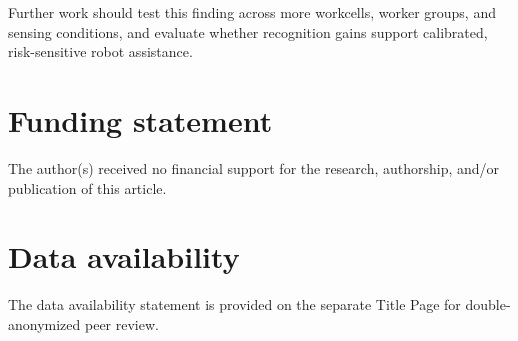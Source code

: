 \documentclass[Afour,sagev,times]{sagej}
\begin{document}
Further work
should test this finding across more workcells, worker groups, and sensing
conditions, and evaluate whether recognition gains support calibrated,
risk-sensitive robot assistance.

\section*{Funding statement}

The author(s) received no financial support for the research, authorship,
and/or publication of this article.

\section*{Data availability}

The data availability statement is provided on the separate Title Page for
double-anonymized peer review.



\end{document}
